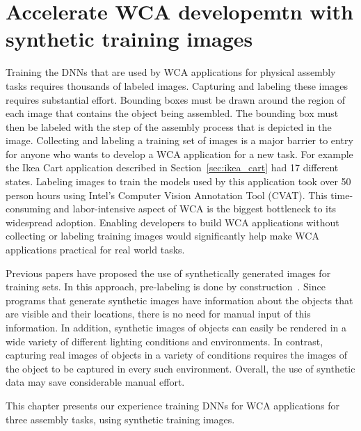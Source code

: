 \chapter{Accelerate WCA developemtn with synthetic training images}\label{chap:synthetic}

Training the DNNs that are used by WCA applications for physical assembly tasks
requires thousands of labeled images.
Capturing and labeling these images requires substantial effort.
Bounding boxes must be drawn around the region of each image that
contains the object being assembled.
The bounding box must then be labeled with the step of the assembly process that
is depicted in the image.
Collecting and labeling a training set of images is a major
barrier to entry for anyone who wants to develop a WCA application for
a new task.
For example the Ikea Cart application described in Section~\ref{sec:ikea_cart}
had 17 different states.
Labeling images to train the models used by this application took over 50 person
hours using Intel's Computer Vision Annotation Tool (CVAT).
This time-consuming and labor-intensive
aspect of WCA is the biggest bottleneck to its widespread adoption.
Enabling developers to build WCA applications without collecting or labeling
training images would significantly help make WCA applications practical for
real world tasks.

Previous papers have proposed the use of synthetically generated
images for training sets.  In this approach, pre-labeling is done by
construction~\cite{synthetic_data, DBLP:journals/corr/abs-1809-10790,
  photo2, real_background1, real_background2, real_background3,
  dwibedi}.  Since programs that generate synthetic images have
information about the objects that are visible and their locations,
there is no need for manual input of this information.  In addition,
synthetic images of objects can easily be rendered in a wide variety
of different lighting conditions and environments.  In contrast,
capturing real images of objects in a variety of conditions requires
the images of the object to be captured in every such environment.
Overall, the use of synthetic data may save considerable manual
effort.

This chapter presents our experience training DNNs for WCA applications for
three assembly tasks, using synthetic training images.

